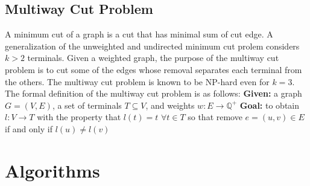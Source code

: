 \documentclass[a4paper]{article}
\begin{document}
\subsection{Multiway Cut Problem}
A minimum cut of a graph is a cut that has minimal sum of cut edge. A generalization of the unweighted and undirected minimum cut prolem considers $k>2$ terminals. Given a weighted graph, the purpose of the multiway cut problem is to cut some of the edges whose removal separates each terminal from the others. The multiway cut problem is known to be NP-hard even for $k = 3$. The formal definition of the multiway cut problem is as follows:
\newline
\indent \textbf{Given:} a graph $G=(V,E)$, a set of terminals $T\subseteq V$, and weights $\textit{w}:E\rightarrow \mathbb{Q}^{+}$
\newline 
\indent \textbf{Goal:} to obtain $l:V\rightarrow T$ with the property that $l(t)=t$ $\forall t\in T$ so that remove $e=(u,v)\in E$ if and only if $l(u)\neq l(v)$
\newline
\section{Algorithms}
\end{document}
